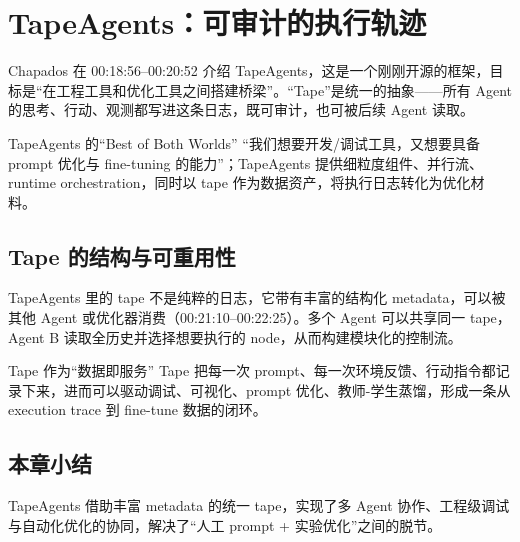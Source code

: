 \section{TapeAgents：可审计的执行轨迹}
Chapados 在 00:18:56--00:20:52 介绍 TapeAgents，这是一个刚刚开源的框架，目标是“在工程工具和优化工具之间搭建桥梁”。“Tape”是统一的抽象——所有 Agent 的思考、行动、观测都写进这条日志，既可审计，也可被后续 Agent 读取。

\begin{importantbox}{TapeAgents 的“Best of Both Worlds”}
``我们想要开发/调试工具，又想要具备 prompt 优化与 fine-tuning 的能力''；TapeAgents 提供细粒度组件、并行流、runtime orchestration，同时以 tape 作为数据资产，将执行日志转化为优化材料。
\end{importantbox}

\subsection{Tape 的结构与可重用性}
TapeAgents 里的 tape 不是纯粹的日志，它带有丰富的结构化 metadata，可以被其他 Agent 或优化器消费（00:21:10--00:22:25）。多个 Agent 可以共享同一 tape，Agent B 读取全历史并选择想要执行的 node，从而构建模块化的控制流。

\begin{knowledgebox}{Tape 作为“数据即服务”}
Tape 把每一次 prompt、每一次环境反馈、行动指令都记录下来，进而可以驱动调试、可视化、prompt 优化、教师-学生蒸馏，形成一条从 execution trace 到 fine-tune 数据的闭环。
\end{knowledgebox}

\subsection{本章小结}
TapeAgents 借助丰富 metadata 的统一 tape，实现了多 Agent 协作、工程级调试与自动化优化的协同，解决了“人工 prompt + 实验优化”之间的脱节。

